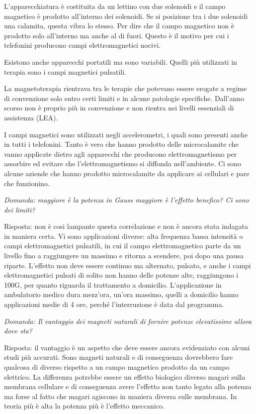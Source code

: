 L'apparecchiatura è costituita da un lettino con due solenoidi e il
campo magnetico è prodotto all'interno dei solenoidi. Se si posizione
tra i due solenoidi una calamita, questa vibra lo stesso. Per dire che
il campo magnetico non è prodotto solo all'interno ma anche al di fuori.
Questo è il motivo per cui i telefonini producono campi elettromagnetici
nocivi.

Esistono anche apparecchi portatili ma sono variabili. Quelli più
utilizzati in terapia sono i campi magnetici pulsatili.

La magnetoterapia rientrava tra le terapie che potevano essere erogate a
regime di convenzione solo entro certi limiti e in alcune patologie
specifiche. Dall'anno scorso non è proprio più in convenzione e non
rientra nei livelli essenziali di assistenza (LEA).

I campi magnetici sono utilizzati negli accelerometri, i quali sono
presenti anche in tutti i telefonini. Tanto è vero che hanno prodotto
delle microcalamite che vanno applicate dietro agli apparecchi che
producono elettromagnetismo per assorbire ed evitare che
l'elettromagnetismo si diffonda nell'ambiente. Ci sono alcune aziende
che hanno prodotto microcalamite da applicare ai cellulari e pare che
funzionino.

\emph{Domanda: maggiore è la potenza in Gauss maggiore è l'effetto
benefico? Ci sono dei limiti? }

Risposta: non è cosi lampante questa correlazione e non è ancora stata
indagata in maniera certa. Vi sono applicazioni diverse: alta frequenza
bassa intensità o campi elettromagnetici pulsatili, in cui il campo
elettromagnetico parte da un livello fino a raggiungere un massimo e
ritorna a scendere, poi dopo una pausa riparte. L'effetto non deve
essere continuo ma alternato, pulsato, e anche i campi elettromagnetici
pulsati di solito non hanno delle potenze alte, raggiungono i 100G, per
quanto riguarda il trattamento a domicilio. L'applicazione in
ambulatorio medico dura mezz'ora, un'ora massimo, quelli a domicilio
hanno applicazioni medie di 4 ore, perché l'interruzione è data dal
programma.

\emph{Domanda: Il vantaggio dei magneti naturali di fornire potenze
elevatissime allora dove sta? }

Risposta: il vantaggio è un aspetto che deve essere ancora evidenziato
con alcuni studi più accurati. Sono magneti naturali e di conseguenza
dovrebbero fare qualcosa di diverso rispetto a un campo magnetico
prodotto da un campo elettrico. La differenza potrebbe essere un effetto
biologico diverso magari sulla membrana cellulare e di conseguenza avere
l'effetto non tanto legato alla potenza ma forse al fatto che magari
agiscono in maniera diversa sulle membrana. In teoria più è alta la
potenza più è l'effetto meccanico.

